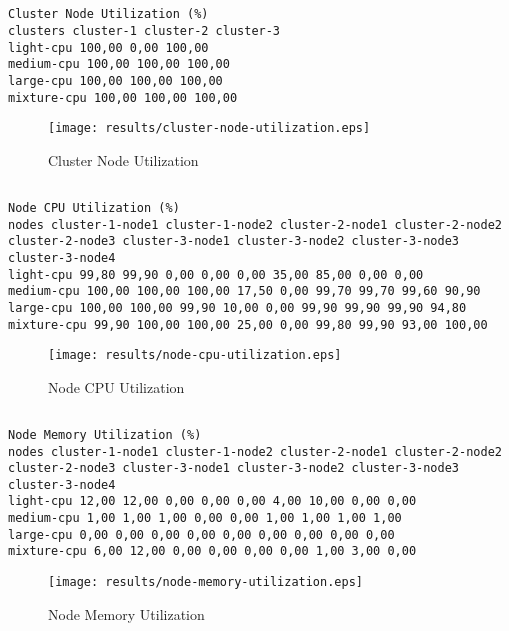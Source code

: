 \documentclass{elsart}
\begin{document}
\subsection{}

\begin{lstlisting}[caption={Cluster Node Utilization}]
Cluster Node Utilization (%)
clusters cluster-1 cluster-2 cluster-3
light-cpu 100,00 0,00 100,00
medium-cpu 100,00 100,00 100,00
large-cpu 100,00 100,00 100,00
mixture-cpu 100,00 100,00 100,00
\end{lstlisting}

\begin{figure}[ht]
\centering
\texttt{[image: results/cluster-node-utilization.eps]}
\caption{Cluster Node Utilization}\label{fig:cluster-node-utilization.eps}
\end{figure}

\subsection{}

\begin{lstlisting}[caption={Node CPU Utilization}]
Node CPU Utilization (%)
nodes cluster-1-node1 cluster-1-node2 cluster-2-node1 cluster-2-node2 cluster-2-node3 cluster-3-node1 cluster-3-node2 cluster-3-node3 cluster-3-node4
light-cpu 99,80 99,90 0,00 0,00 0,00 35,00 85,00 0,00 0,00
medium-cpu 100,00 100,00 100,00 17,50 0,00 99,70 99,70 99,60 90,90
large-cpu 100,00 100,00 99,90 10,00 0,00 99,90 99,90 99,90 94,80
mixture-cpu 99,90 100,00 100,00 25,00 0,00 99,80 99,90 93,00 100,00
\end{lstlisting}

\begin{figure}[ht]
\centering
\texttt{[image: results/node-cpu-utilization.eps]}
\caption{Node CPU Utilization}\label{fig:node-cpu-utilization.eps}
\end{figure}

\subsection{}

\begin{lstlisting}[caption={Node Memory Utilization}]
Node Memory Utilization (%)
nodes cluster-1-node1 cluster-1-node2 cluster-2-node1 cluster-2-node2 cluster-2-node3 cluster-3-node1 cluster-3-node2 cluster-3-node3 cluster-3-node4
light-cpu 12,00 12,00 0,00 0,00 0,00 4,00 10,00 0,00 0,00
medium-cpu 1,00 1,00 1,00 0,00 0,00 1,00 1,00 1,00 1,00
large-cpu 0,00 0,00 0,00 0,00 0,00 0,00 0,00 0,00 0,00
mixture-cpu 6,00 12,00 0,00 0,00 0,00 0,00 1,00 3,00 0,00
\end{lstlisting}

\begin{figure}[ht]
\centering
\texttt{[image: results/node-memory-utilization.eps]}
\caption{Node Memory Utilization}\label{fig:node-memory-utilization.eps}
\end{figure}
\end{document}
